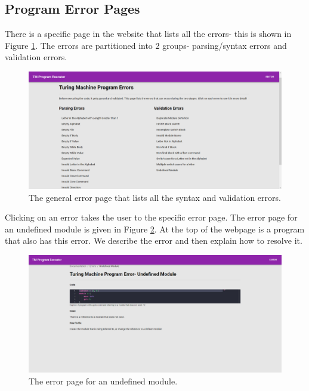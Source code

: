 \begin{appendices}
\newpage

\section{Program Error Pages}
There is a specific page in the website that lists all the errors- this is shown in Figure \ref{fig:general_error_page}. The errors are partitioned into 2 groups- parsing/syntax errors and validation errors. 

\begin{figure}[htb]
    \centering
    \includegraphics[scale=0.18]{images/General Error Page.png}
    \caption{The general error page that lists all the syntax and validation errors.}
    \label{fig:general_error_page}
\end{figure}

Clicking on an error takes the user to the specific error page. The error page for an undefined module is given in Figure \ref{fig:specific_error_page}. At the top of the webpage is a program that also has this error. We describe the error and then explain how to resolve it.

\begin{figure}[htb]
    \centering
    \includegraphics[scale=0.18]{images/Specific Error Page.png}
    \caption{The error page for an undefined module.}
    \label{fig:specific_error_page}
\end{figure}


\end{appendices}
